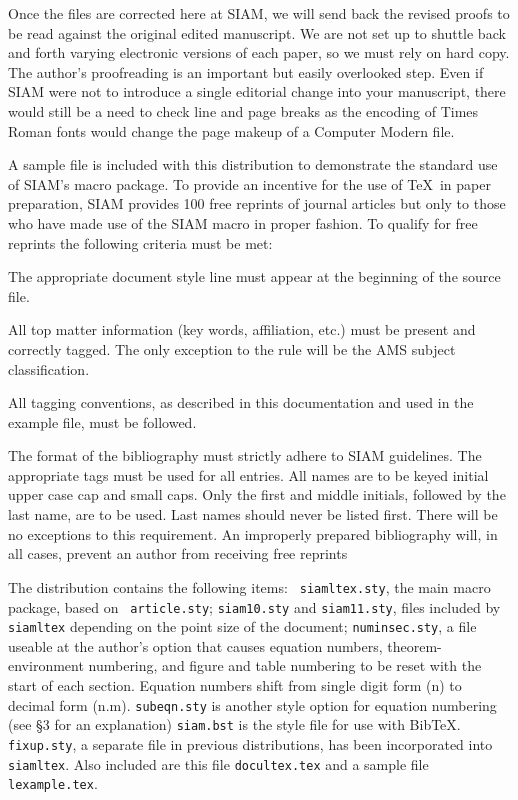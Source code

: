 Once the files are corrected here at SIAM, we will send back the revised 
proofs to be read against the original edited manuscript. We are not
set up to shuttle back and forth varying electronic versions of each
paper, so we must rely on hard copy. The author's proofreading
is an important but easily overlooked step. Even if SIAM were not
to introduce a single editorial change into your manuscript, there
would still be a need to check line and page breaks as the encoding
of Times Roman fonts would change the page makeup of a Computer
Modern file.
 

A sample file is included with this distribution to
demonstrate the standard use of SIAM's macro package. To
provide an incentive for the use of \TeX\ in paper
preparation, SIAM provides 100 free reprints of journal
articles but only to those who have made use of the SIAM
macro in proper fashion. To qualify for free reprints the
following criteria must be met:
\begin{remunerate}
\item The appropriate document style line must appear at
the beginning of the source file.
\item All top matter information (key words, affiliation, etc.) must
be present and correctly tagged. The only exception to the rule will be
the AMS subject classification.
\item All tagging conventions, as described in this documentation
and used in the example file, must be followed.
\item The format of the bibliography must strictly adhere to SIAM
guidelines. The appropriate tags must be used for all entries. All names
are to be keyed initial upper case cap and small caps. Only the first
and middle initials, followed by the last name, are to be used.
Last names should never be listed first. There will be no exceptions
to this requirement. An improperly prepared bibliography will,
in all cases, prevent an author from receiving free reprints
\end{remunerate}


The distribution contains the following items: {\tt
siamltex.sty}, the main macro package, based on {\tt
article.sty}; {\tt siam10.sty} and {\tt siam11.sty}, files
included by {\tt siamltex} depending on the point
size of the document; {\tt numinsec.sty}, a file
useable at the author's option that causes equation numbers, 
theorem-environment numbering, and figure and table numbering 
to be reset with the start of each section. Equation numbers shift from
single digit form (n) to decimal form (n.m). {\tt subeqn.sty}
is another style option for equation numbering (see \S3 for
an explanation) {\tt siam.bst}
is the style file for use with Bib\TeX. {\tt fixup.sty}, a 
separate file in previous distributions, has been
incorporated into {\tt siamltex}. Also included are this
file {\tt docultex.tex} and a sample file {\tt lexample.tex}.

